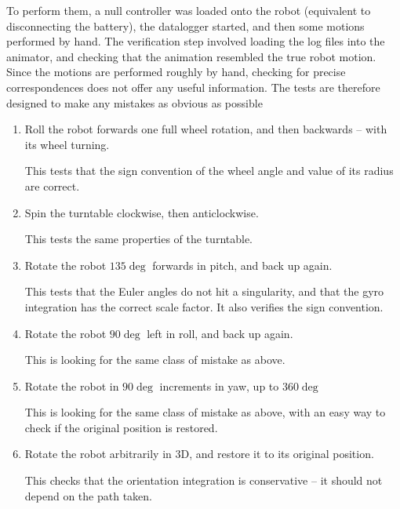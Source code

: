 \documentclass[main.tex]{subfiles}
\begin{document}
		To perform them, a null controller was loaded onto the robot (equivalent to disconnecting the battery), the datalogger started, and then some motions performed by hand.
		The verification step involved loading the log files into the animator, and checking that the animation resembled the true robot motion.
		Since the motions are performed roughly by hand, checking for precise correspondences does not offer any useful information.
		The tests are therefore designed to make any mistakes as obvious as possible

		\begin{enumerate}
			\item \label{sensor-test-wheel}
				Roll the robot forwards one full wheel rotation, and then backwards -- with its wheel turning.

				This tests that the sign convention of the wheel angle and value of its radius are correct.

			\item \label{sensor-test-tt}
				Spin the turntable clockwise, then anticlockwise.

				This tests the same properties of the turntable.

			\item \label{sensor-test-pitch}
				Rotate the robot $135\deg$ forwards in pitch, and back up again.

				This tests that the Euler angles do not hit a singularity, and that the gyro integration has the correct scale factor.
				It also verifies the sign convention.

			\item \label{sensor-test-roll}

			    Rotate the robot $90\deg$ left in roll, and back up again.

			    This is looking for the same class of mistake as above.

			\item \label{sensor-test-yaw}
				Rotate the robot in $90\deg$ increments in yaw, up to $360\deg$

			    This is looking for the same class of mistake as above, with an easy way to check if the original position is restored.

			\item \label{sensor-test-free}
			    Rotate the robot arbitrarily in 3D, and restore it to its original position.

			    This checks that the orientation integration is conservative -- it should not depend on the path taken.
		\end{enumerate}
\end{document}
